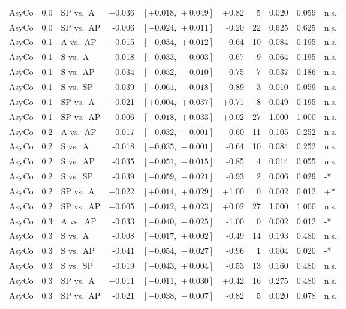\begin{landscape}
\begin{scriptsize}
\begin{longtable}{lllrrrrrrl}
AsyCo & 0.0 & SP vs.\ A & +0.036 & $[+0.018,\,+0.049]$ & +0.82 & 5 & 0.020 & 0.059 & n.s. \\
AsyCo & 0.0 & SP vs.\ AP & -0.006 & $[-0.024,\,+0.011]$ & -0.20 & 22 & 0.625 & 0.625 & n.s. \\
AsyCo & 0.1 & A vs.\ AP & -0.015 & $[-0.034,\,+0.012]$ & -0.64 & 10 & 0.084 & 0.195 & n.s. \\
AsyCo & 0.1 & S vs.\ A & -0.018 & $[-0.033,\,-0.003]$ & -0.67 & 9 & 0.064 & 0.195 & n.s. \\
AsyCo & 0.1 & S vs.\ AP & -0.034 & $[-0.052,\,-0.010]$ & -0.75 & 7 & 0.037 & 0.186 & n.s. \\
AsyCo & 0.1 & S vs.\ SP & -0.039 & $[-0.061,\,-0.018]$ & -0.89 & 3 & 0.010 & 0.059 & n.s. \\
AsyCo & 0.1 & SP vs.\ A & +0.021 & $[+0.004,\,+0.037]$ & +0.71 & 8 & 0.049 & 0.195 & n.s. \\
AsyCo & 0.1 & SP vs.\ AP & +0.006 & $[-0.018,\,+0.033]$ & +0.02 & 27 & 1.000 & 1.000 & n.s. \\
AsyCo & 0.2 & A vs.\ AP & -0.017 & $[-0.032,\,-0.001]$ & -0.60 & 11 & 0.105 & 0.252 & n.s. \\
AsyCo & 0.2 & S vs.\ A & -0.018 & $[-0.035,\,-0.001]$ & -0.64 & 10 & 0.084 & 0.252 & n.s. \\
AsyCo & 0.2 & S vs.\ AP & -0.035 & $[-0.051,\,-0.015]$ & -0.85 & 4 & 0.014 & 0.055 & n.s. \\
AsyCo & 0.2 & S vs.\ SP & -0.039 & $[-0.059,\,-0.021]$ & -0.93 & 2 & 0.006 & 0.029 & -* \\
AsyCo & 0.2 & SP vs.\ A & +0.022 & $[+0.014,\,+0.029]$ & +1.00 & 0 & 0.002 & 0.012 & +* \\
AsyCo & 0.2 & SP vs.\ AP & +0.005 & $[-0.012,\,+0.023]$ & +0.02 & 27 & 1.000 & 1.000 & n.s. \\
AsyCo & 0.3 & A vs.\ AP & -0.033 & $[-0.040,\,-0.025]$ & -1.00 & 0 & 0.002 & 0.012 & -* \\
AsyCo & 0.3 & S vs.\ A & -0.008 & $[-0.017,\,+0.002]$ & -0.49 & 14 & 0.193 & 0.480 & n.s. \\
AsyCo & 0.3 & S vs.\ AP & -0.041 & $[-0.054,\,-0.027]$ & -0.96 & 1 & 0.004 & 0.020 & -* \\
AsyCo & 0.3 & S vs.\ SP & -0.019 & $[-0.043,\,+0.004]$ & -0.53 & 13 & 0.160 & 0.480 & n.s. \\
AsyCo & 0.3 & SP vs.\ A & +0.011 & $[-0.011,\,+0.030]$ & +0.42 & 16 & 0.275 & 0.480 & n.s. \\
AsyCo & 0.3 & SP vs.\ AP & -0.021 & $[-0.038,\,-0.007]$ & -0.82 & 5 & 0.020 & 0.078 & n.s. \\

\end{longtable}
\end{scriptsize}
\end{landscape}
